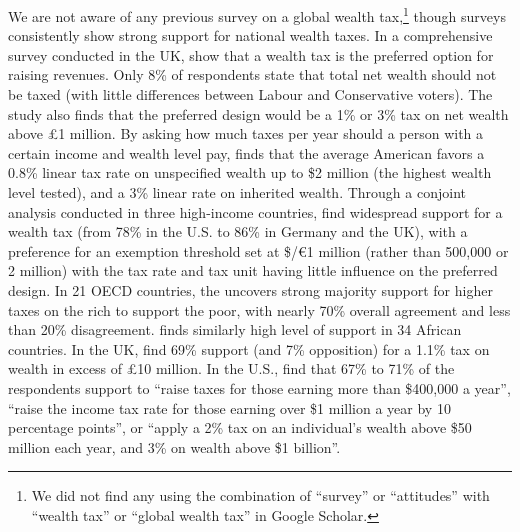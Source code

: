 We are not aware of any previous survey on a global wealth tax,\footnote{We did not find any using the combination of ``survey'' or ``attitudes'' with ``wealth tax'' or ``global wealth tax'' in Google Scholar.} though surveys consistently show strong support for national wealth taxes. 
In a comprehensive survey conducted in the UK, \citet{rowlingson_public_2021} show that a wealth tax is the preferred option for raising revenues. Only 8\% of respondents state that total net wealth should not be taxed (with little differences between Labour and Conservative voters). The study also finds that the preferred design would be a 1\% or 3\% tax on net wealth above £1 million. 
By asking how much taxes per year should a person with a certain income and wealth level pay, \citet{fisman_americans_2017} finds that the average American favors a 0.8\% linear tax rate on unspecified wealth up to \$2 million (the highest wealth level tested), and a 3\% linear rate on inherited wealth. %
Through a conjoint analysis conducted in three high-income countries, \citet{schechtl_tax_2023} find widespread support for a wealth tax (from 78\% in the U.S. to 86\% in Germany and the UK), with a preference for an exemption threshold set at \$/\euro{}1 million (rather than 500,000 or 2 million) with the tax rate and tax unit having little influence on the preferred design. 
In 21 OECD countries, the \citet{oecd_main_2019} uncovers strong majority support for higher taxes on the rich to support the poor, with nearly 70\% overall agreement and less than 20\% disagreement. \citet{isbell_footing_2022} finds similarly high level of support in 34 African countries. 
In the UK, \citet{patriotic_millionaires_patriotic_2022} find 69\% support (and 7\% opposition) for a 1.1\% tax on wealth in excess of £10 million. 
In the U.S., \citet{americans_for_tax_fairness_support_2021} find that 67\% to 71\% of the respondents support to ``raise taxes for those earning more than \$400,000 a year'', ``raise the income tax rate for those earning over \$1 million a year by 10 percentage points'', or ``apply a 2\% tax on an individual's wealth above \$50 million each year, and 3\% on wealth above \$1 billion''.


